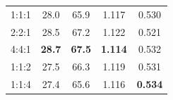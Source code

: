 \documentclass{article}
\begin{document}
\begin{table}
\begin{minipage}[htbp]{0.45\textwidth}
{\begin{tabular}{ccccc}
\midrule[0.5pt]
    1:1:1  & 28.0 & 65.9 & 1.117 & 0.530  \\
    2:2:1  & 28.5 & 67.2 & 1.122 & 0.521 \\ 
    4:4:1  & \textbf{28.7} & \textbf{67.5} & \textbf{1.114} & 0.532 \\ 
    1:1:2  & 27.5 & 66.3 & 1.119 & 0.531 \\ 
    1:1:4  & 27.4 & 65.6 & 1.116 & \textbf{0.534} \\ 
\bottomrule[1.5pt]
\end{tabular}
}
\end{minipage}
\end{table}


\end{document}
